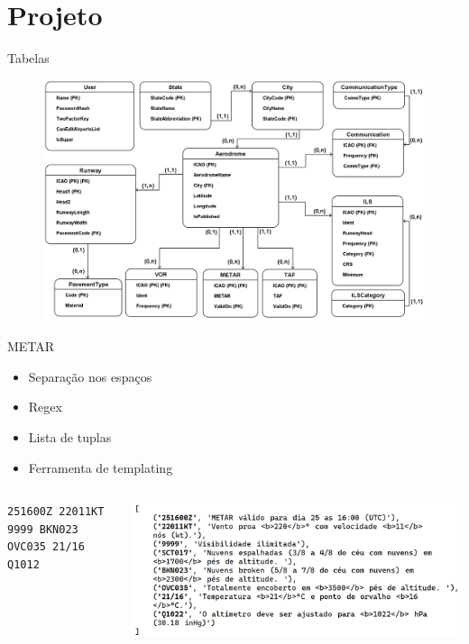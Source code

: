 \documentclass{beamer}
\begin{document}
\section{Projeto}

\begin{frame}{Tabelas}
    \begin{figure}[ht]
        \begin{center}
        \includegraphics[width=0.8\linewidth]{img/ERAero.png}
        \label{fig:arquitetura}
        \end{center}
    \end{figure}
\end{frame}

\begin{frame}{METAR}
    \centering
    \begin{itemize}
        \item Separação nos espaços
        \item Regex
        \item Lista de tuplas
        \item Ferramenta de templating
    \end{itemize}

    \begin{minipage}[b]{0.9\linewidth}
        \begin{columns}
            \begin{column}{0.4\textwidth}
                \tiny{\texttt{251600Z 22011KT 9999 BKN023 OVC035 21/16 Q1012}}
            \end{column}
            \begin{column}{0.6\textwidth}
                \includegraphics[width=\linewidth]{img/metar-dec.png}
            \end{column}
        \end{columns}
    \end{minipage}
\end{frame}
\end{document}

